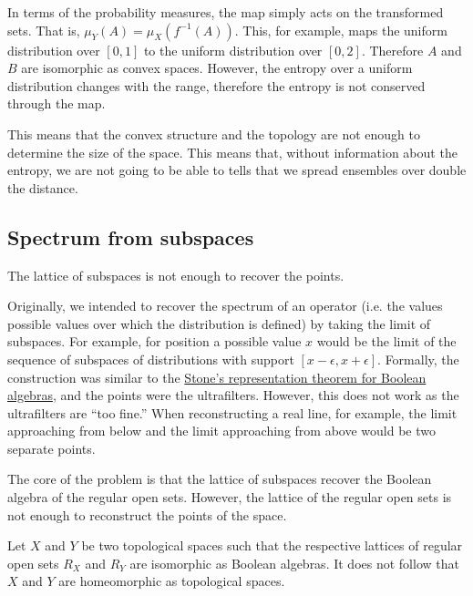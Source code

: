 \begin{defn}
	In terms of the probability measures, the map simply acts on the transformed sets. That is, $\mu_Y(A) = \mu_X(f^{-1}(A))$. This, for example, maps the uniform distribution over $[0,1]$ to the uniform distribution over $[0,2]$. Therefore $A$ and $B$ are isomorphic as convex spaces. However, the entropy over a uniform distribution changes with the range, therefore the entropy is not conserved through the map.
\end{defn}

This means that the convex structure and the topology are not enough to determine the size of the space. This means that, without information about the entropy, we are not going to be able to tells that we spread ensembles over double the distance.


\subsection{Spectrum from subspaces}

\begin{insight}
	The lattice of subspaces is not enough to recover the points.
\end{insight}

Originally, we intended to recover the spectrum of an operator (i.e. the values possible values over which the distribution is defined) by taking the limit of subspaces. For example, for position a possible value $x$ would be the limit of the sequence of subspaces of distributions with support $[x-\epsilon, x+\epsilon]$. Formally, the construction was similar to the \href{https://en.wikipedia.org/wiki/Stone%27s_representation_theorem_for_Boolean_algebras}{Stone's representation theorem for Boolean algebras}, and the points were the ultrafilters. However, this does not work as the ultrafilters are ``too fine.'' When reconstructing a real line, for example, the limit approaching from below and the limit approaching from above would be two separate points.

The core of the problem is that the lattice of subspaces recover the Boolean algebra of the regular open sets. However, the lattice of the regular open sets is not enough to reconstruct the points of the space.

\begin{prop}\label{pm_es_regularOpenSetsNotEnough}
	Let $X$ and $Y$ be two topological spaces such that the respective lattices of regular open sets $R_X$ and $R_Y$ are isomorphic as Boolean algebras. It does not follow that $X$ and $Y$ are homeomorphic as topological spaces.
\end{prop}

